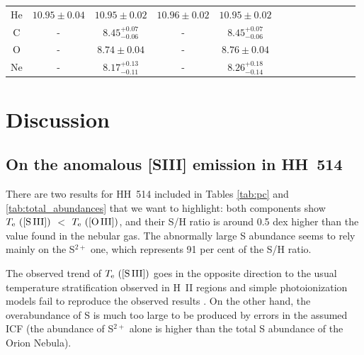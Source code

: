 \documentclass[fleqn,usenatbib]{mnras}
\begin{document}
\begin{table}
\begin{tabular}{ccccccccccccc}
He  &$10.95 \pm 0.04$  & $10.95 \pm 0.02$ & $10.96 \pm 0.02$ & $10.95 \pm 0.02$\\

C & - &$8.45 ^{+0.07} _{-0.06}$&-&$8.45 ^{+0.07} _{-0.06}$\\ 

O  &  - & $8.74 \pm 0.04$ &-&$8.76 \pm 0.04$\\ 

Ne  & - &$8.17 ^{+0.13} _{-0.11}$&-&$8.26 ^{+0.18} _{-0.14}$\\

\hline
\end{tabular}
\end{table}


\section{Discussion}
\label{sec:disc}


\subsection{On the anomalous [S\thinspace III] emission in HH~514}
\label{subsec:under_TS3}

There are two results for HH~514 included in Tables \ref{tab:pc} and \ref{tab:total_abundances}  that we want to highlight: both components show $T_{\rm e} \text{ ([S\thinspace III])}$ $<$ $T_{\rm e} \text{ ([O\thinspace III])}$, and their S/H ratio is around 0.5 dex higher than the value found in the nebular gas. The abnormally large S abundance seems to rely mainly on the S$^{2+}$ one, which represents 91 per cent of the S/H ratio.

The observed trend of $T_{\rm e} \text{ ([S\thinspace III])}$ goes in the opposite direction to the usual temperature stratification observed in H~II regions and simple photoionization models fail to reproduce the observed results \citep[][]{Binette2012}. On the other hand, the overabundance of S is much too large to be produced by errors in the assumed ICF (the abundance of S$^{2+}$ alone is higher than the total S abundance of the Orion Nebula).
\end{document}
